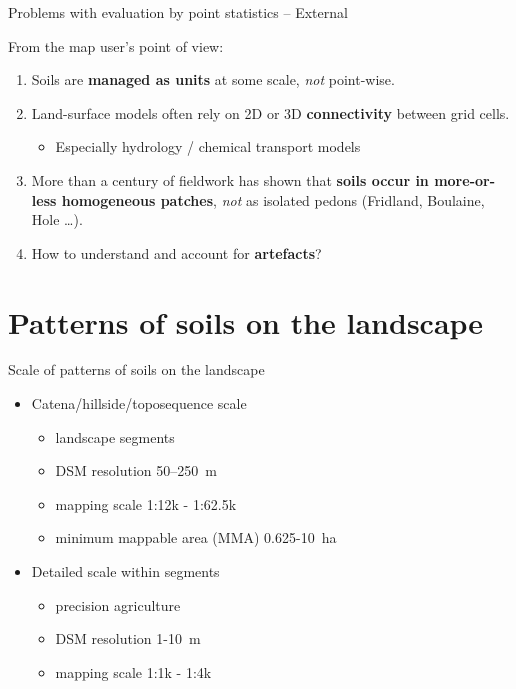 \documentclass[aspectratio=169, 10pt]{beamer}
\begin{document}
\begin{frame}{Problems with evaluation by point statistics -- External}

From the map user's point of view:
\begin{enumerate}
\item  Soils are \textbf{managed as units} at some scale, \emph{not} point-wise.
\item  Land-surface models often rely on 2D or 3D \textbf{connectivity} between grid cells.
  \begin{itemize}
  \item Especially hydrology / chemical transport models
  \end{itemize}
\item  More than a century of fieldwork has shown that \textbf{soils  occur in more-or-less homogeneous patches}, \emph{not} as isolated
  pedons (Fridland, Boulaine, Hole \ldots).
\item How to understand and account for \textbf{artefacts}?
  \end{enumerate}
  
\end{frame}

\section{Patterns of soils on the landscape}

\begin{frame}{Scale of patterns of soils on the landscape}
\begin{itemize}
    \item Catena/hillside/toposequence scale
    \begin{itemize}
        \item landscape segments
        \item DSM resolution 50--250~m
        \item mapping scale 1:12k - 1:62.5k
        \item minimum mappable area (MMA) 0.625-10~ha
        \end{itemize}
    \item Detailed scale within segments
    \begin{itemize}
        \item precision agriculture
        \item DSM resolution 1-10~m
        \item mapping scale 1:1k - 1:4k
    \end{itemize}
\end{itemize}
\end{frame}
\end{document}
